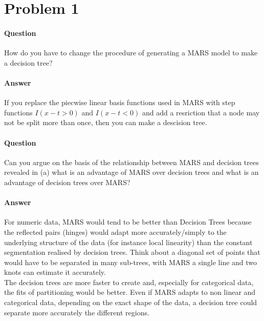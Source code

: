 \section*{Problem 1}

\paragraph{Question}How do you have to change the procedure of generating a MARS model to make a decision tree?

\paragraph{Answer} If you replace the piecwise linear basis functions used in MARS with step functions $I(x-t > 0)$ and $I(x-t < 0)$ and add a resriction that a node may not be split more than once, then you can make a descision tree. 

\paragraph{Question}Can you argue on the basis of the relationship between MARS and decision trees revealed in (a) what is an advantage of MARS over decision trees and what is an advantage of decision trees over MARS?
\\



\paragraph{Answer}For numeric data, MARS would tend to be better than Decision Trees because the reflected pairs (hinges) would adapt more accurately/simply to the underlying structure of the data (for instance local linearity) than the constant segmentation realised by decision trees. Think about a diagonal set of points that would have to be separated in many sub-trees, with MARS a single line and two knots can estimate it accurately. \\

\noindent The decision trees are more faster to create and, especially for categorical data, the fits of partitioning would be better. Even if MARS adapts to non linear and categorical data, depending on the exact shape of the data, a decision tree could separate more accurately the different regions.  






